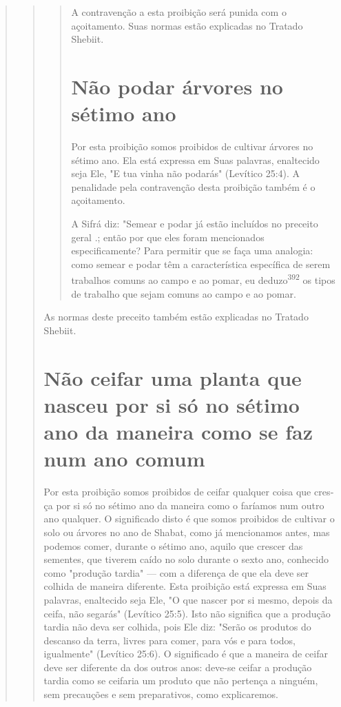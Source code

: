 \begin{quote}
\begin{quote}
\begin{quote}
A contravenção a esta proibição será punida com o açoitamento. Suas
normas estão explicadas no Tratado Shebiit.


\section{Não podar árvores no sétimo ano}

Por esta proibição somos proibidos de cultivar árvores no sétimo ano.
Ela está expressa em Suas palavras, enaltecido seja Ele, "E tua vinha
não podarás" (Levítico 25:4). A penalidade pela contravenção desta
proibição tam­bém é o açoitamento.

A Sifrá diz: "Semear e podar já estão incluídos no preceito geral
.; então por que eles foram mencionados
especificamente? Para permitir que se faça uma analogia: como semear e
podar têm a característica específica de se­rem trabalhos comuns ao
campo e ao pomar, eu deduzo\textsuperscript{392} os tipos de traba­lho
que sejam comuns ao campo e ao pomar.
\end{quote}

As normas deste preceito também estão explicadas no Tratado Shebiit.

\section{Não ceifar uma planta que nasceu por si só no sétimo ano da
maneira como se faz num ano comum}

Por esta proibição somos proibidos de ceifar qualquer coisa que cres­ça
por si só no sétimo ano da maneira como o faríamos num outro ano
qual­quer. O significado disto é que somos proibidos de cultivar o solo
ou árvores no ano de Shabat, como já mencionamos antes, mas podemos
comer, durante o sétimo ano, aquilo que crescer das sementes, que
tiverem caído no solo du­rante o sexto ano, conhecido como "produção
tardia" --- com a diferença de que ela deve ser colhida de maneira
diferente. Esta proibição está expressa em Suas palavras, enaltecido
seja Ele, "O que nascer por si mesmo, depois da ceifa, não segarás"
(Levítico 25:5). Isto não significa que a produção tardia não deva ser
colhida, pois Ele diz: "Serão os produtos do descanso da terra, livres
para comer, para vós e para todos, igualmente" (Levítico 25:6). O
significado é que a maneira de ceifar deve ser diferente da dos outros
anos: deve-se ceifar a pro­dução tardia como se ceifaria um produto que
não pertença a ninguém, sem precauções e sem preparativos, como
explicaremos.


\end{quote}
\end{quote}
